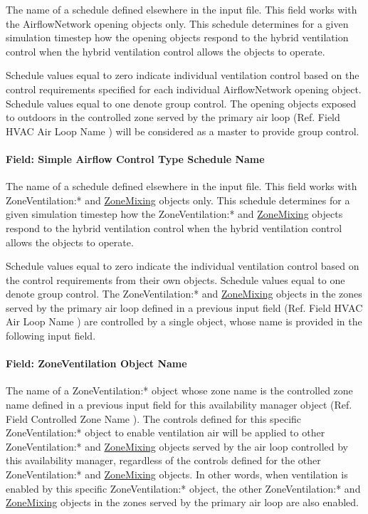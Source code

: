 The name of a schedule defined elsewhere in the input file. This field works with the AirflowNetwork opening objects only. This schedule determines for a given simulation timestep how the opening objects respond to the hybrid ventilation control when the hybrid ventilation control allows the objects to operate.

Schedule values equal to zero indicate individual ventilation control based on the control requirements specified for each individual AirflowNetwork opening object. Schedule values equal to one denote group control. The opening objects exposed to outdoors in the controlled zone served by the primary air loop (Ref. Field HVAC Air Loop Name ) will be considered as a master to provide group control.

\paragraph{Field: Simple Airflow Control Type Schedule Name}\label{field-simple-airflow-control-type-schedule-name}

The name of a schedule defined elsewhere in the input file. This field works with ZoneVentilation:* and \hyperref[zonemixing]{ZoneMixing} objects only. This schedule determines for a given simulation timestep how the ZoneVentilation:* and \hyperref[zonemixing]{ZoneMixing} objects respond to the hybrid ventilation control when the hybrid ventilation control allows the objects to operate.

Schedule values equal to zero indicate the individual ventilation control based on the control requirements from their own objects. Schedule values equal to one denote group control. The ZoneVentilation:* and \hyperref[zonemixing]{ZoneMixing} objects in the zones served by the primary air loop defined in a previous input field (Ref. Field HVAC Air Loop Name ) are controlled by a single object, whose name is provided in the following input field.

\paragraph{Field: ZoneVentilation Object Name}\label{field-zoneventilation-object-name}

The name of a ZoneVentilation:* object whose zone name is the controlled zone name defined in a previous input field for this availability manager object (Ref. Field Controlled Zone Name ). The controls defined for this specific ZoneVentilation:* object to enable ventilation air will be applied to other ZoneVentilation:* and \hyperref[zonemixing]{ZoneMixing} objects served by the air loop controlled by this availability manager, regardless of the controls defined for the other ZoneVentilation:* and \hyperref[zonemixing]{ZoneMixing} objects. In other words, when ventilation is enabled by this specific ZoneVentilation:* object, the other ZoneVentilation:* and \hyperref[zonemixing]{ZoneMixing} objects in the zones served by the primary air loop are also enabled.


